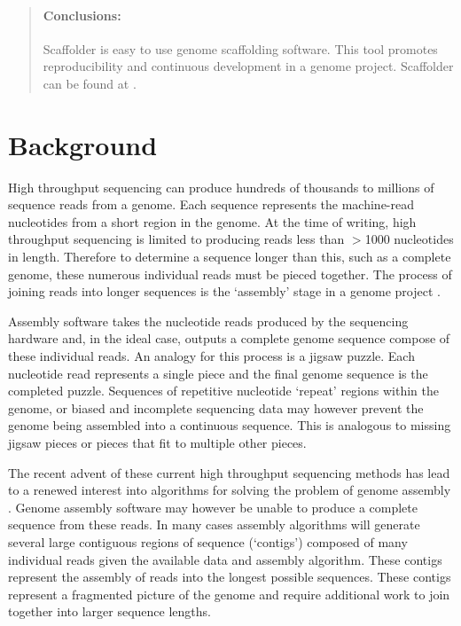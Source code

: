 \documentclass[10pt]{bmc_article}
\newenvironment{bmcformat}{\begin{raggedright}\baselineskip20pt\sloppy\setboolean{publ}{false}}{\end{raggedright}\baselineskip20pt\sloppy}
\begin{document}
\begin{bmcformat}
\begin{abstract}
  \paragraph*{Conclusions:} Scaffolder is easy to use genome scaffolding
  software. This tool promotes reproducibility and continuous development in a
  genome project. Scaffolder can be found at \scaffolder.

\end{abstract}


\clearpage

\section*{Background} %

High throughput sequencing can produce hundreds of thousands to millions of
sequence reads from a genome. Each sequence represents the machine-read
nucleotides from a short region in the genome. At the time of writing, high
throughput sequencing is limited to producing reads less than $>$1000
nucleotides in length. Therefore to determine a sequence longer than this, such
as a complete genome, these numerous individual reads must be pieced together.
The process of joining reads into longer sequences is the `assembly' stage in
a genome project \cite{miller2010}. \pb

Assembly software takes the nucleotide reads produced by the sequencing
hardware and, in the ideal case, outputs a complete genome sequence compose of
these individual reads. An analogy for this process is a jigsaw puzzle. Each
nucleotide read represents a single piece and the final genome sequence is the
completed puzzle. Sequences of repetitive nucleotide `repeat' regions within
the genome, or biased and incomplete sequencing data may however prevent the
genome being assembled into a continuous sequence. This is analogous to missing
jigsaw pieces or pieces that fit to multiple other pieces. \pb

The recent advent of these current high throughput sequencing methods has lead
to a renewed interest into algorithms for solving the problem of genome
assembly \cite{pop2008,pop2009}. Genome assembly software may however be unable
to produce a complete sequence from these reads. In many cases assembly
algorithms will generate several large contiguous regions of sequence
(`contigs') composed of many individual reads given the available data and
assembly algorithm. These contigs represent the assembly of reads into the
longest possible sequences. These contigs represent a fragmented picture of the
genome and require additional work to join together into larger sequence
lengths. \pb


\end{bmcformat}
\end{document}
